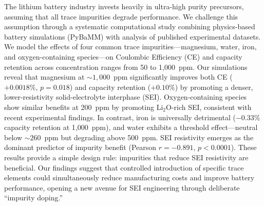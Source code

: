 The lithium battery industry invests heavily in ultra-high purity precursors, assuming that all trace impurities degrade performance. We challenge this assumption through a systematic computational study combining physics-based battery simulations (PyBaMM) with analysis of published experimental datasets. We model the effects of four common trace impurities---magnesium, water, iron, and oxygen-containing species---on Coulombic Efficiency (CE) and capacity retention across concentration ranges from 50 to 1{,}000~ppm. Our simulations reveal that magnesium at ${\sim}1{,}000$~ppm significantly improves both CE ($+0.0018\%$, $p=0.018$) and capacity retention ($+0.10\%$) by promoting a denser, lower-resistivity solid-electrolyte interphase (SEI). Oxygen-containing species show similar benefits at 200~ppm by promoting Li$_2$O-rich SEI, consistent with recent experimental findings. In contrast, iron is universally detrimental ($-0.33\%$ capacity retention at 1{,}000~ppm), and water exhibits a threshold effect---neutral below ${\sim}260$~ppm but degrading above 500~ppm. SEI resistivity emerges as the dominant predictor of impurity benefit (Pearson $r=-0.891$, $p<0.0001$). These results provide a simple design rule: impurities that reduce SEI resistivity are beneficial. Our findings suggest that controlled introduction of specific trace elements could simultaneously reduce manufacturing costs and improve battery performance, opening a new avenue for SEI engineering through deliberate ``impurity doping.''
